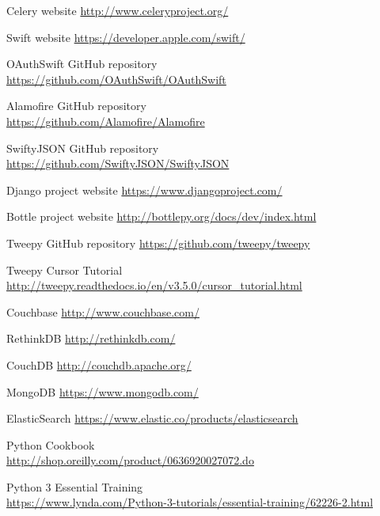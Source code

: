 \documentclass{article}
\begin{document}
\begin{thebibliography}{9}
    Celery website \url{http://www.celeryproject.org/}

    Swift website \url{https://developer.apple.com/swift/}
    
    OAuthSwift GitHub repository \\
    \url{https://github.com/OAuthSwift/OAuthSwift}
    
    Alamofire GitHub repository \\
    \url{https://github.com/Alamofire/Alamofire}
    
    SwiftyJSON GitHub repository \\
    \url{https://github.com/SwiftyJSON/SwiftyJSON}
    
    Django project website \url{https://www.djangoproject.com/}
    
    Bottle project website \url{http://bottlepy.org/docs/dev/index.html}
    
    Tweepy GitHub repository \url{https://github.com/tweepy/tweepy}

    Tweepy Cursor Tutorial \\ 
    \url{http://tweepy.readthedocs.io/en/v3.5.0/cursor_tutorial.html}
    
    Couchbase \url{http://www.couchbase.com/}
    
    RethinkDB \url{http://rethinkdb.com/}

    CouchDB \url{http://couchdb.apache.org/}

    MongoDB \url{https://www.mongodb.com/}

    ElasticSearch \url{https://www.elastic.co/products/elasticsearch}
    
    Python Cookbook \\
    \url{http://shop.oreilly.com/product/0636920027072.do}
    
    Python 3 Essential Training \\ \url{https://www.lynda.com/Python-3-tutorials/essential-training/62226-2.html}

\end{thebibliography}


\newpage
\end{document}
